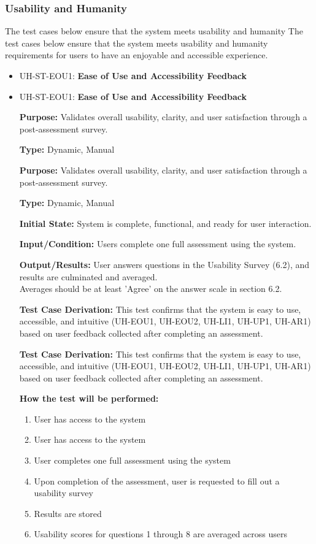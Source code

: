 \documentclass[12pt, titlepage]{article}
\begin{document}
\subsubsection{Usability and Humanity}
\hspace{2em}The test cases below ensure that the system meets usability and humanity
\hspace{2em}The test cases below ensure that the system meets usability and humanity
requirements for users to have an enjoyable and accessible experience.

\begin{itemize}
  \item UH-ST-EOU1: \textbf{Ease of Use and Accessibility Feedback}
  \item UH-ST-EOU1: \textbf{Ease of Use and Accessibility Feedback}
  \begin{mdframed}[linewidth=0.5mm]
      \textbf{Purpose:} Validates overall usability, clarity, and user satisfaction through a post-assessment survey. \par
      \textbf{Type:} Dynamic, Manual \par
      \textbf{Purpose:} Validates overall usability, clarity, and user satisfaction through a post-assessment survey. \par
      \textbf{Type:} Dynamic, Manual \par
      \textbf{Initial State:} System is complete, functional, and ready for user interaction. \par
      \textbf{Input/Condition:} Users complete one full assessment using the system. \par
      \textbf{Output/Results:} User answers questions in the Usability Survey (6.2), and results are culminated and averaged.\\
      Averages should be at least 'Agree' on the answer scale in section 6.2. \par
      \textbf{Test Case Derivation:} This test confirms that the system is easy to use, accessible, and intuitive (UH-EOU1, UH-EOU2, UH-LI1, UH-UP1, UH-AR1) based on user feedback collected after completing an assessment. \par
      \textbf{Test Case Derivation:} This test confirms that the system is easy to use, accessible, and intuitive (UH-EOU1, UH-EOU2, UH-LI1, UH-UP1, UH-AR1) based on user feedback collected after completing an assessment. \par
      \textbf{How the test will be performed:}
      \begin{enumerate}[noitemsep]
        \item User has access to the system
        \item User has access to the system
        \item User completes one full assessment using the system
        \item Upon completion of the assessment, user is requested to fill out a usability survey
        \item Results are stored
        \item Usability scores for questions 1 through 8 are averaged across users
      \end{enumerate}
  \end{mdframed}


\end{itemize}
\end{document}
